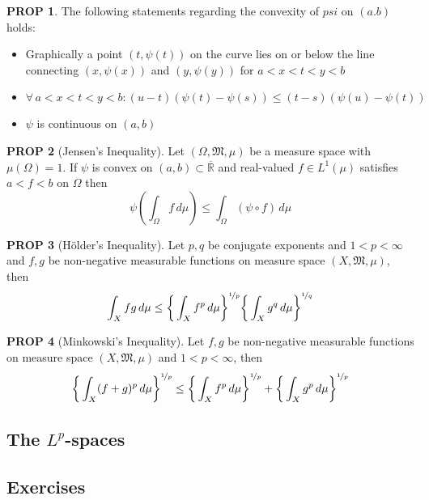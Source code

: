 \documentclass[hidelinks,10pt]{article}
\theoremstyle{definition}
\theoremstyle{dotles}
\theoremstyle{dotless}
\newtheorem{proposition}{PROP}[section]
\theoremstyle{remark}
\begin{document}
\begin{proposition}
The following statements regarding the convexity of $psi$ on $(a.b)$ holds:\begin{itemize}
    \item Graphically a point $(t,\psi(t))$ on the curve lies on or below the line connecting $(x,\psi(x))$ and $(y,\psi(y))$ for $a<x<t<y<b$
    \item $\forall\,a<x<t<y<b:(u-t)(\psi(t)-\psi(s))\leq(t-s)(\psi(u)-\psi(t))$
    \item $\psi$ is continuous on $(a,b)$
\end{itemize}
\end{proposition}

\begin{proposition}[Jensen's Inequality]
Let $(\Omega,\mathfrak{M},\mu)$ be a measure space with $\mu(\Omega)=1$. If $\psi$ is convex on $(a,b)\subset\overline{\mathbb{R}}$ and real-valued $f\in L^1(\mu)$ satisfies $a<f<b$ on $\Omega$ then
\[\psi\left(\int_\Omega f\,d\mu\right)\leq\int_\Omega(\psi\circ f)\,d\mu\]
\end{proposition}

\begin{proposition}[Hölder's Inequality]
Let $p,q$ be conjugate exponents and $1<p<\infty$ and $f,g$ be non-negative measurable functions on measure space $(X,\mathfrak{M},\mu)$, then
\[\int_Xfg\,d\mu\leq\bigg\{\int_Xf^p\,d\mu\bigg\}^{\nicefrac{1}{p}}\bigg\{\int_Xg^q\,d\mu\bigg\}^{\nicefrac{1}{q}}\]
\end{proposition}

\begin{proposition}[Minkowski's Inequality]
Let $f,g$ be non-negative measurable functions on measure space $(X,\mathfrak{M},\mu)$ and $1<p<\infty$, then
\[\bigg\{\int_X(f+g)^p\,d\mu\bigg\}^{\nicefrac{1}{p}}\leq\bigg\{\int_Xf^p\,d\mu\bigg\}^{\nicefrac{1}{p}}+\bigg\{\int_Xg^p\,d\mu\bigg\}^{\nicefrac{1}{p}}\]
\end{proposition}

\subsection{The $L^p$-spaces}

\subsection*{Exercises}
\end{document}
